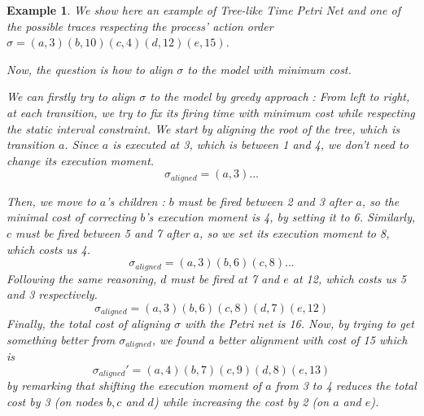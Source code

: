 \documentclass[conference]{IEEEtran}
\newtheorem{example}{Example}
\begin{document}
\begin{example}\label{Tree-like Time Petri Net}
		We show here an example of Tree-like Time Petri Net and one of the 
		possible traces respecting the process' action order $\sigma = (a,3)(b,10)(c,4)(d,12)(e,15)$.
		\vspace{0.4cm}

	Now, the question is how to align $\sigma$ to the model with minimum cost. 

	We can firstly try to align $\sigma$ to the model by greedy approach : From left to right, 
	at each transition, we try to fix its firing time with minimum cost while respecting the static interval constraint. We start by aligning the root of the tree,
	which is transition $a$. Since $a$ is executed at 3, which is between 1 and 4, we don't need to 
	change its execution moment. 
	\[\sigma_{aligned} = (a,3)...\]

Then, we move to $a$'s children :
$b$ must be fired between 2 and 3 after $a$, so the minimal cost of correcting $b$'s execution moment is 4,
by setting it to 6. Similarly, $c$ must be fired between 5 and 7 after $a$, so we set its execution moment to 8, 
which costs us 4. 
\[\sigma_{aligned} = (a,3)(b,6)(c,8)...\]
Following the same reasoning, $d$ must be fired at 7 and $e$ at 12, which costs us 5 and 3 respectively.
\[\sigma_{aligned} = (a,3)(b,6)(c,8)(d,7)(e,12)\]
Finally, the total cost of aligning $\sigma$ with the Petri net is 16. Now, by trying to get something 
better from $\sigma_{aligned}$, we found a better alignment with cost of 15 which is
\[\sigma_{aligned}' = (a,4)(b,7)(c,9)(d,8)(e,13)\]
by remarking that shifting the execution moment of $a$ from 3 to 4 reduces the total cost by 3 (on nodes $b, c$ and $d$) while increasing the cost by 2 (on $a$ and $e$).
\end{example}
\end{document}
